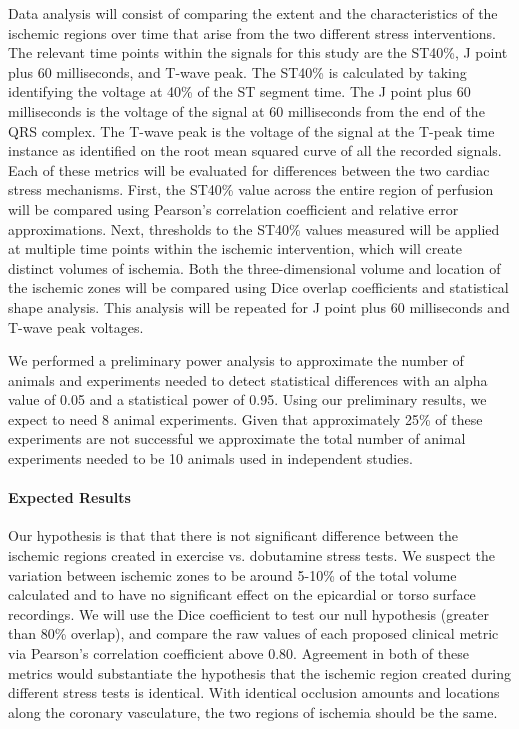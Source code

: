 Data analysis will consist of comparing the extent and the characteristics of the ischemic regions over time that arise from the two different stress interventions. The relevant time points within the signals for this study are the ST40\%, J point plus 60 milliseconds, and T-wave peak. The ST40\% is calculated by taking identifying the voltage at 40\% of the ST segment time. The J point plus 60 milliseconds is the voltage of the signal at 60 milliseconds from the end of the QRS complex. The T-wave peak is the voltage of the signal at the T-peak time instance as identified on the root mean squared curve of all the recorded signals. Each of these metrics will be evaluated for differences between the two cardiac stress mechanisms. First, the ST40\% value across the entire region of perfusion will be compared using Pearson's correlation coefficient and relative error approximations. Next, thresholds to the ST40\% values measured will be applied at multiple time points within the ischemic intervention, which will create distinct volumes of ischemia. Both the three-dimensional volume and location of the ischemic zones will be compared using Dice overlap coefficients and statistical shape analysis. This analysis will be repeated for J point plus 60 milliseconds and T-wave peak voltages. 

We performed a preliminary power analysis to approximate the number of animals and experiments needed to detect statistical differences with an alpha value of 0.05 and a statistical power of 0.95. Using our preliminary results, we expect to need 8 animal experiments. Given that approximately 25\% of these experiments are not successful we approximate the total number of animal experiments needed to be 10 animals used in independent studies. 

\paragraph{Expected Results} Our hypothesis is that that there is not significant difference between the ischemic regions created in exercise vs. dobutamine stress tests. We suspect the variation between ischemic zones to be around 5-10\% of the total volume calculated and to have no significant effect on the epicardial or torso surface recordings.  We will use the Dice
coefficient to test our null hypothesis (greater than 80\% overlap), and
compare the raw values of each proposed clinical metric via Pearson's correlation
coefficient above 0.80. Agreement in both of these metrics would
substantiate the hypothesis that the ischemic region created during
different stress tests is identical. With identical occlusion amounts and
locations along the coronary vasculature, the two regions of ischemia
should be the same. 

